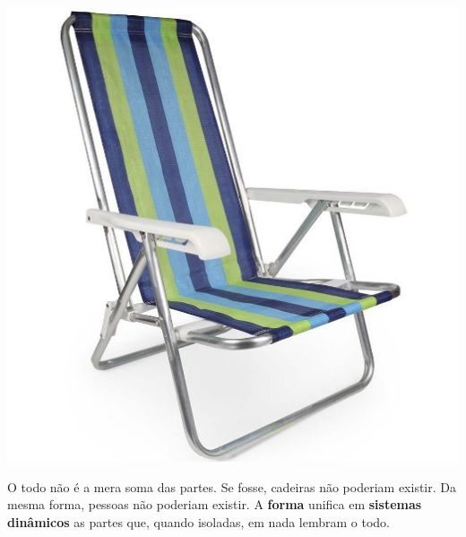 \documentclass[./main.tex]{subfiles}
\begin{document}
\nolinenumbers

\newpage
\renewcommand{\headrulewidth}{0pt}
\thispagestyle{fancy}
\fancyhf{} %
\fancyfoot{} %
\fancyfoot[C]{\thepage}

\par \hfill
\vspace{40mm}
\begin{adjustwidth}{45pt}{45pt}
\begin{center}
    \includegraphics[scale=1]{figs/fig_chair.jpg}\\
\end{center}
\vspace{10mm}
\noindent \textsf{O todo não é a mera soma das partes. Se fosse, cadeiras não poderiam existir. Da mesma forma, pessoas não poderiam existir. A \textbf{forma} unifica em \textbf{sistemas dinâmicos} as partes que, quando isoladas, em nada lembram o todo.}
\end{adjustwidth}
\clearpage
\end{document}
